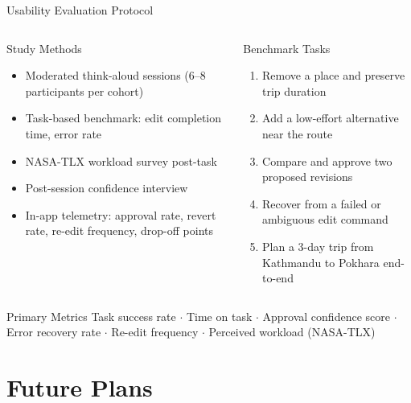 \documentclass[aspectratio=169,professionalfonts]{beamer}
\begin{document}
\begin{frame}{Usability Evaluation Protocol}
  \begin{columns}[T]
    \begin{block}{Study Methods}
      \begin{itemize}
        \item Moderated think-aloud sessions (6--8 participants per cohort)
        \item Task-based benchmark: edit completion time, error rate
        \item NASA-TLX workload survey post-task
        \item Post-session confidence interview
        \item In-app telemetry: approval rate, revert rate, re-edit frequency,
              drop-off points
      \end{itemize}
    \end{block}

    \begin{block}{Benchmark Tasks}
      \begin{enumerate}
        \item Remove a place and preserve trip duration
        \item Add a low-effort alternative near the route
        \item Compare and approve two proposed revisions
        \item Recover from a failed or ambiguous edit command
        \item Plan a 3-day trip from Kathmandu to Pokhara end-to-end
      \end{enumerate}
    \end{block}
  \end{columns}

  \vspace{0.18cm}
  \begin{exampleblock}{Primary Metrics \cite{lazar2017,dumas1999,iso9241}}
    Task success rate $\cdot$ Time on task $\cdot$ Approval confidence score $\cdot$
    Error recovery rate $\cdot$ Re-edit frequency $\cdot$ Perceived workload (NASA-TLX)
  \end{exampleblock}
\end{frame}

\section{Future Plans}
\end{document}
